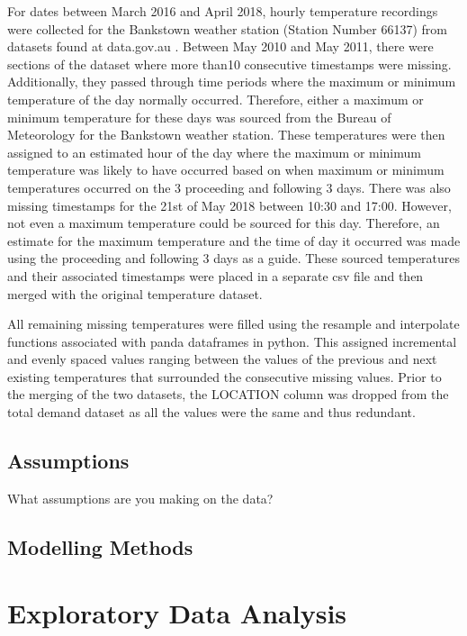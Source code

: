 \documentclass[mstat,12pt]{unswthesis}
\begin{document}
\bigskip

For dates between March 2016 and April 2018, hourly temperature
recordings were collected for the Bankstown weather station (Station
Number 66137) from datasets found at data.gov.au \cite{DATAGOV}. Between
May 2010 and May 2011, there were sections of the dataset where more
than10 consecutive timestamps were missing. Additionally, they passed
through time periods where the maximum or minimum temperature of the day
normally occurred. Therefore, either a maximum or minimum temperature
for these days was sourced from the Bureau of Meteorology \cite{BOM} for
the Bankstown weather station. These temperatures were then assigned to
an estimated hour of the day where the maximum or minimum temperature
was likely to have occurred based on when maximum or minimum
temperatures occurred on the 3 proceeding and following 3 days. There
was also missing timestamps for the 21st of May 2018 between 10:30 and
17:00. However, not even a maximum temperature could be sourced for this
day. Therefore, an estimate for the maximum temperature and the time of
day it occurred was made using the proceeding and following 3 days as a
guide. These sourced temperatures and their associated timestamps were
placed in a separate csv file and then merged with the original
temperature dataset.

\bigskip

All remaining missing temperatures were filled using the resample and
interpolate functions associated with panda dataframes in python. This
assigned incremental and evenly spaced values ranging between the values
of the previous and next existing temperatures that surrounded the
consecutive missing values. Prior to the merging of the two datasets,
the LOCATION column was dropped from the total demand dataset as all the
values were the same and thus redundant.

\hypertarget{assumptions}{%
\section{Assumptions}\label{assumptions}}

What assumptions are you making on the data?

\hypertarget{modelling-methods}{%
\section{Modelling Methods}\label{modelling-methods}}

\hypertarget{exploratory-data-analysis}{%
\chapter{Exploratory Data Analysis}\label{exploratory-data-analysis}}
\end{document}
